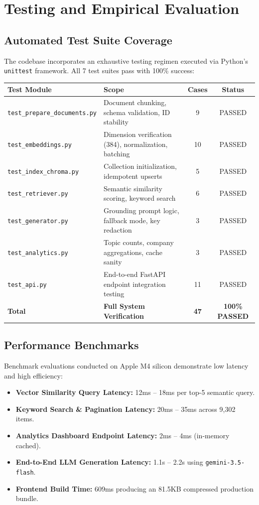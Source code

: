 \documentclass[11pt]{article}
\begin{document}
\section{Testing and Empirical Evaluation}

\subsection{Automated Test Suite Coverage}
The codebase incorporates an exhaustive testing regimen executed via Python's \texttt{unittest} framework. All 7 test suites pass with 100\% success:

\begin{center}
\small
\begin{tabular}{llcc}
\toprule
\textbf{Test Module} & \textbf{Scope} & \textbf{Cases} & \textbf{Status} \\
\midrule
\texttt{test\_prepare\_documents.py} & Document chunking, schema validation, ID stability & 9 & PASSED \\
\texttt{test\_embeddings.py} & Dimension verification (384), normalization, batching & 10 & PASSED \\
\texttt{test\_index\_chroma.py} & Collection initialization, idempotent upserts & 5 & PASSED \\
\texttt{test\_retriever.py} & Semantic similarity scoring, keyword search & 6 & PASSED \\
\texttt{test\_generator.py} & Grounding prompt logic, fallback mode, key redaction & 3 & PASSED \\
\texttt{test\_analytics.py} & Topic counts, company aggregations, cache sanity & 3 & PASSED \\
\texttt{test\_api.py} & End-to-end FastAPI endpoint integration testing & 11 & PASSED \\
\midrule
\textbf{Total} & \textbf{Full System Verification} & \textbf{47} & \textbf{100\% PASSED} \\
\bottomrule
\end{tabular}
\end{center}

\subsection{Performance Benchmarks}
Benchmark evaluations conducted on Apple M4 silicon demonstrate low latency and high efficiency:
\begin{itemize}[leftmargin=1.5em]
    \item \textbf{Vector Similarity Query Latency:} 12ms -- 18ms per top-5 semantic query.
    \item \textbf{Keyword Search \& Pagination Latency:} 20ms -- 35ms across 9,302 items.
    \item \textbf{Analytics Dashboard Endpoint Latency:} 2ms -- 4ms (in-memory cached).
    \item \textbf{End-to-End LLM Generation Latency:} 1.1s -- 2.2s using \texttt{gemini-3.5-flash}.
    \item \textbf{Frontend Build Time:} 609ms producing an 81.5KB compressed production bundle.
\end{itemize}
\end{document}
